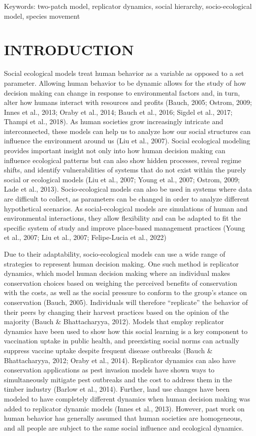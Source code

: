 \documentclass[
  12pt,
]{article}
\begin{document}
Keywords: two-patch model, replicator dynamics, social hierarchy, socio-ecological model, species movement

\section{INTRODUCTION}\label{introduction}

Social ecological models treat human behavior as a variable as opposed to a set parameter. Allowing human behavior to be dynamic allows for the study of how decision making can change in response to environmental factors and, in turn, alter how humans interact with resources and profits (Bauch, 2005; Ostrom, 2009; Innes et al., 2013; Oraby et al., 2014; Bauch et al., 2016; Sigdel et al., 2017; Thampi et al., 2018). As human societies grow increasingly intricate and interconnected, these models can help us to analyze how our social structures can influence the environment around us (Liu et al., 2007). Social ecological modeling provides important insight not only into how human decision making can influence ecological patterns but can also show hidden processes, reveal regime shifts, and identify vulnerabilities of systems that do not exist within the purely social or ecological models (Liu et al., 2007; Young et al., 2007; Ostrom, 2009; Lade et al., 2013). Socio-ecological models can also be used in systems where data are difficult to collect, as parameters can be changed in order to analyze different hypothetical scenarios. As social-ecological models are simulations of human and environmental interactions, they allow flexibility and can be adapted to fit the specific system of study and improve place-based management practices (Young et al., 2007; Liu et al., 2007; Felipe-Lucia et al., 2022)

Due to their adaptability, socio-ecological models can use a wide range of strategies to represent human decision making. One such method is replicator dynamics, which model human decision making where an individual makes conservation choices based on weighing the perceived benefits of conservation with the costs, as well as the social pressure to conform to the group's stance on conservation (Bauch, 2005). Individuals will therefore ``replicate'' the behavior of their peers by changing their harvest practices based on the opinion of the majority (Bauch \& Bhattacharyya, 2012). Models that employ replicator dynamics have been used to show how this social learning is a key component to vaccination uptake in public health, and preexisting social norms can actually suppress vaccine uptake despite frequent disease outbreaks (Bauch \& Bhattacharyya, 2012; Oraby et al., 2014). Replicator dynamics can also have conservation applications as pest invasion models have shown ways to simultaneously mitigate pest outbreaks and the cost to address them in the timber industry (Barlow et al., 2014). Further, land use changes have been modeled to have completely different dynamics when human decision making was added to replicator dynamic models (Innes et al., 2013). However, past work on human behavior has generally assumed that human societies are homogeneous, and all people are subject to the same social influence and ecological dynamics.
\end{document}
